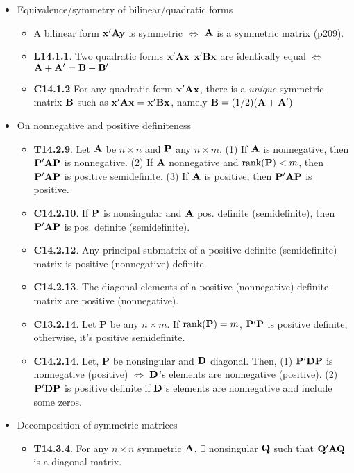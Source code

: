 \documentclass[a4paper, oneside]{book}
\begin{document}
\begin{itemize}
\item Equivalence/symmetry of bilinear/quadratic forms
	\begin{itemize}
	\item A bilinear form $\mathbf{x'Ay}$ is symmetric $\iff$ $\mathbf{A}$ is a symmetric matrix (p209).
	\item \textbf{L14.1.1}. Two quadratic forms $\mathbf{x'Ax}$  $\mathbf{x'Bx}$ are identically equal $\iff$ $\mathbf{A+A'=B+B'}$ 
	\item \textbf{C14.1.2} For any quadratic form $\mathbf{x'Ax}$, there is a \textit{unique} symmetric matrix $\mathbf{B}$ such as $\mathbf{x'Ax=x'Bx}$, namely $\mathbf{B}=(1/2)\mathbf{(A+A')}$
 	\end{itemize}
\item On nonnegative and positive definiteness
	\begin{itemize}
	\item \textbf{T14.2.9}. Let $\mathbf{A}$ be $n\times n$ and $\mathbf{P}$ any $n\times m$. (1) If $\mathbf{A}$ is nonnegative, then $\mathbf{P'AP}$ is nonnegative. (2) If $\mathbf{A}$ nonnegative and $\text{rank}(\mathbf{P})<m$, then $\mathbf{P'AP}$ is positive semidefinite. (3) If $\mathbf{A}$ is positive, then $\mathbf{P'AP}$ is positive.
	\item \textbf{C14.2.10}. If $\mathbf{P}$ is nonsingular and $\mathbf{A}$ pos. definite (semidefinite), then $\mathbf{P'AP}$ is pos. definite (semidefinite).
	\item \textbf{C14.2.12}. Any principal submatrix of a positive definite (semidefinite) matrix is positive (nonnegative) definite.
	\item \textbf{C14.2.13}. The diagonal elements of a positive (nonnegative) definite matrix are positive (nonnegative).
	\item \textbf{C13.2.14}. Let $\textbf{P}$ be any $n\times m$. If $\text{rank}(\mathbf{P})=m$, $\mathbf{P'P}$ is positive definite, otherwise, it's positive semidefinite. 
	\item \textbf{C14.2.14}. Let, $\textbf{P}$ be nonsingular and $\mathbf{D}$ diagonal. Then, (1) $\mathbf{P'DP}$ is nonnegative (positive) $\iff$ $\mathbf{D}$'s elements are nonnegative (positive). (2) $\mathbf{P'DP}$ is positive definite if $\mathbf D$'s elements are nonnegative and include some zeros.
	\end{itemize}
\item Decomposition of symmetric matrices
	\begin{itemize}
	\item \textbf{T14.3.4}. For any $n\times n$ symmetric $\mathbf{A}$, $\exists$ nonsingular $\mathbf{Q}$ such that $\mathbf{Q'AQ}$ is a diagonal matrix.

\end{itemize}
\end{itemize}
\end{document}
